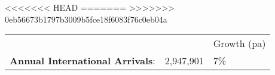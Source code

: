 <<<<<<< HEAD
=======
>>>>>>> 0eb56673b1797b3009b5fce18f6083f76c0eb04a
\begin{tabular}[t]{p{5cm}p{1.3cm}p{1.2cm}}
   &   & Growth (pa) \\ 
 \textbf{Annual International Arrivals}: & 2,947,901 & 7\% \\ 
  \end{tabular}
